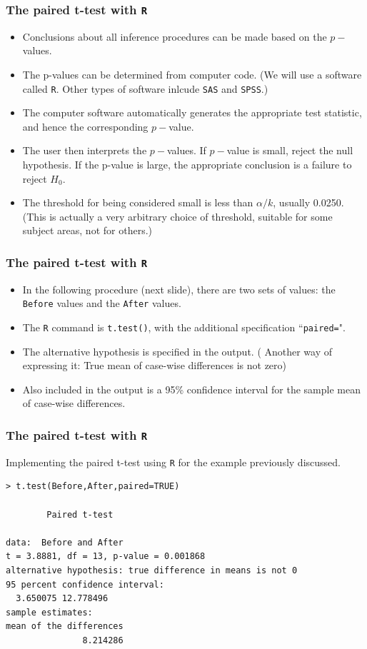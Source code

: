 \documentclass[a4]{beamer}
\begin{document}
\begin{frame}[fragile]
\frametitle{The paired t-test with \texttt{R}}
\begin{itemize}
\item Conclusions about all inference procedures can be made based on the $p-$values.
\item The p-values can be determined from computer code. (We will use a software called \texttt{R}. Other types of software inlcude \texttt{SAS} and \texttt{SPSS}.)
\item The computer software automatically generates the appropriate test statistic, and hence the corresponding $p-$value.
\item The user then interprets the $p-$values. If $p-$value is small, reject the null hypothesis. If the p-value is large, the appropriate conclusion is a failure to reject $H_0$.
\item The threshold for being considered small is less than $\alpha/k$, usually 0.0250. \\ (This is actually a very arbitrary choice of threshold, suitable for some subject areas, not for others.)
\end{itemize}
\end{frame}
\begin{frame}[fragile]
\frametitle{The paired t-test with \texttt{R}}

\begin{itemize}
\item In the following procedure (next slide), there are two sets of values: the \texttt{Before} values and the \texttt{After} values.
\item The \texttt{R} command is \texttt{t.test()}, with the additional specification ``\texttt{paired=}".
\item The alternative hypothesis is specified in the output. ( Another way of expressing it: True mean of case-wise differences is not zero)
\item Also included in the output is a 95\% confidence interval for the sample mean of case-wise differences.
\end{itemize}
\end{frame}
\begin{frame}[fragile]
\frametitle{The paired t-test with \texttt{R}}
Implementing the paired t-test using \texttt{R} for the example previously discussed.
\begin{verbatim}
> t.test(Before,After,paired=TRUE)

        Paired t-test

data:  Before and After
t = 3.8881, df = 13, p-value = 0.001868
alternative hypothesis: true difference in means is not 0
95 percent confidence interval:
  3.650075 12.778496
sample estimates:
mean of the differences
               8.214286

\end{verbatim}
\end{frame}
\end{document}
